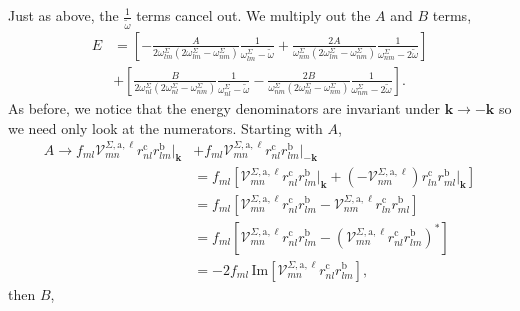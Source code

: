 \documentclass[letterpaper,aps]{revtex4}
\begin{document}
Just as above, the $\frac{1}{\tilde\omega}$ terms cancel out. We multiply out the 
$A$ and $B$ terms,
\begin{align}\label{emultipied}  
E&=  
\left[
-\frac{A}{2\omega^\Sigma_{lm}(2\omega^\Sigma_{lm}-\omega^\Sigma_{nm})}\frac{1}{\omega^\Sigma_{lm}-\tilde\omega}
+\frac{2A}{\omega^\Sigma_{nm}(2\omega^\Sigma_{lm}-\omega^\Sigma_{nm})}\frac{1}{\omega^\Sigma_{nm}-2\tilde\omega}
\right]
\nonumber\\
&+ 
\left[
 \frac{B}{2\omega^\Sigma_{nl}(2\omega^\Sigma_{nl}-\omega^\Sigma_{nm})}\frac{1}{\omega^\Sigma_{nl}-\tilde\omega}
-\frac{2B}{\omega^\Sigma_{nm}(2\omega^\Sigma_{nl}-\omega^\Sigma_{nm})}\frac{1}{\omega^\Sigma_{nm}-2\tilde\omega}
\right]
.
\end{align}  
As before, we notice that the energy denominators are invariant under 
$\mathbf{k} \rightarrow - \mathbf{k}$ so we need only look at the numerators.
Starting with $A$,
\begin{align*}
A \rightarrow f_{ml}\mathcal{V}^{\Sigma,\text{a},\ell}_{mn}
    r^{\text{c}}_{nl}r^{\text{b}}_{lm}\vert_{\mathbf{k}}
&+  f_{ml}\mathcal{V}^{\Sigma,\text{a},\ell}_{mn}r^{\text{c}}_{nl}
    r^{\text{b}}_{lm}\vert_{-\mathbf{k}}\nonumber\\
&=  f_{ml}\left[\mathcal{V}^{\Sigma,\text{a},\ell}_{mn}
    r^{\text{c}}_{nl}r^{\text{b}}_{lm}\vert_{\mathbf{k}} 
+   \left(-\mathcal{V}^{\Sigma,\text{a},\ell}_{nm}\right)
    r^{\text{c}}_{ln}r^{\text{b}}_{ml}\vert_{\mathbf{k}}\right]\nonumber\\
&=  f_{ml}\left[\mathcal{V}^{\Sigma,\text{a},\ell}_{mn}
    r^{\text{c}}_{nl}r^{\text{b}}_{lm} 
-   \mathcal{V}^{\Sigma,\text{a},\ell}_{nm}
    r^{\text{c}}_{ln}r^{\text{b}}_{ml}\right]\nonumber\\
&=  f_{ml}\left[\mathcal{V}^{\Sigma,\text{a},\ell}_{mn}
    r^{\text{c}}_{nl}r^{\text{b}}_{lm}
-   \left(\mathcal{V}^{\Sigma,\text{a},\ell}_{mn}
    r^{\text{c}}_{nl}r^{\text{b}}_{lm}\right)^*\right]\nonumber\\
&= -2f_{ml}\,\mathrm{Im}\left[\mathcal{V}^{\Sigma,\text{a},\ell}_{mn}
    r^{\text{c}}_{nl}r^{\text{b}}_{lm}\right]
,
\end{align*}
then $B$,
\end{document}
